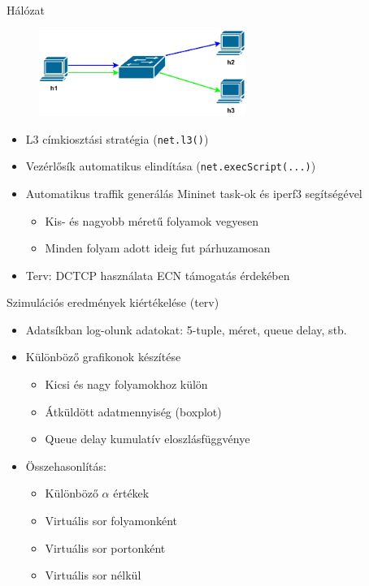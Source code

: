 \documentclass{beamer}
\begin{document}
\begin{frame}{Hálózat}
\begin{figure}
    \centering
    \includegraphics[width=0.6\textwidth]{net}
\end{figure}
\begin{itemize}
    \item L3 címkiosztási stratégia (\texttt{net.l3()})
    \item Vezérlősík automatikus elindítása (\texttt{net.execScript(...)})
    \item Automatikus traffik generálás Mininet task-ok és iperf3 segítségével
        \begin{itemize}
            \item Kis- és nagyobb méretű folyamok vegyesen
            \item Minden folyam adott ideig fut párhuzamosan
        \end{itemize}
    \item Terv: DCTCP használata ECN támogatás érdekében
\end{itemize}
\end{frame}

\begin{frame}{Szimulációs eredmények kiértékelése (terv)}
\begin{itemize}
    \item Adatsíkban log-olunk adatokat: 5-tuple, méret, queue delay, stb.
    \item Különböző grafikonok készítése
    \begin{itemize}
        \item Kicsi és nagy folyamokhoz külön
        \item Átküldött adatmennyiség (boxplot)
        \item Queue delay kumulatív eloszlásfüggvénye
    \end{itemize}
    \item Összehasonlítás:
    \begin{itemize}
        \item Különböző $\alpha$ értékek
        \item Virtuális sor folyamonként
        \item Virtuális sor portonként
        \item Virtuális sor nélkül
    \end{itemize}
\end{itemize}
\end{frame}
\end{document}

